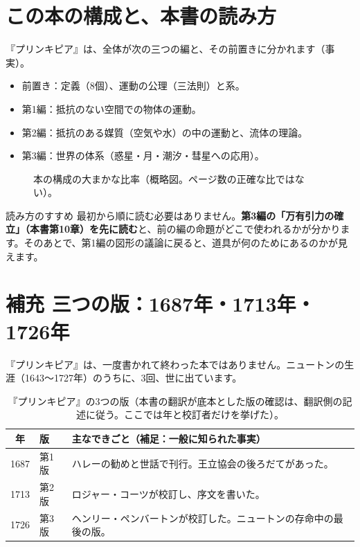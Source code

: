 \documentclass[a4paper,11pt,openany]{ltjsbook}
\begin{document}
\section{この本の構成と、本書の読み方}

『プリンキピア』は、全体が次の三つの編と、その前置きに分かれます（事実）。

\begin{itemize}[leftmargin=1.5em]
\item 前置き：定義（8個）、運動の公理（三法則）と系。
\item 第1編：抵抗のない空間での物体の運動。
\item 第2編：抵抗のある媒質（空気や水）の中の運動と、流体の理論。
\item 第3編：世界の体系（惑星・月・潮汐・彗星への応用）。
\end{itemize}

\begin{figure}[htbp]
\centering
{}
\caption{本の構成の大まかな比率（概略図。ページ数の正確な比ではない）。}
\end{figure}

\begin{examplebox}{読み方のすすめ}
最初から順に読む必要はありません。\textbf{第3編の「万有引力の確立」（本書第10章）を先に読む}と、前の編の命題がどこで使われるかが分かります。そのあとで、第1編の図形の議論に戻ると、道具が何のためにあるのかが見えます。
\end{examplebox}

\section{補充 三つの版：1687年・1713年・1726年}

『プリンキピア』は、一度書かれて終わった本ではありません。ニュートンの生涯（1643〜1727年）のうちに、3回、世に出ています。

\begin{table}[htbp]
\centering
\begin{tabular}{clp{7.2cm}}
\toprule
年 & 版 & 主なできごと（補足：一般に知られた事実）\\
\midrule
1687 & 第1版 & ハレーの勧めと世話で刊行。王立協会の後ろだてがあった。\\
1713 & 第2版 & ロジャー・コーツが校訂し、序文を書いた。\\
1726 & 第3版 & ヘンリー・ペンバートンが校訂した。ニュートンの存命中の最後の版。\\
\bottomrule
\end{tabular}
\caption{『プリンキピア』の3つの版（本書の翻訳が底本とした版の確認は、翻訳側の記述に従う。ここでは年と校訂者だけを挙げた）。}
\end{table}
\end{document}
